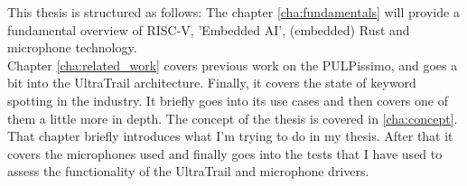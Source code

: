 This thesis is structured as follows:
The chapter \ref{cha:fundamentals} will provide a fundamental overview of RISC-V, 'Embedded AI', (embedded) Rust and microphone technology.\\
Chapter \ref{cha:related_work} covers previous work on the PULPissimo, and goes a bit into the UltraTrail architecture.
Finally, it covers the state of keyword spotting in the industry.
It briefly goes into its use cases and then covers one of them a little more in depth.
The concept of the thesis is covered in \ref{cha:concept}.
That chapter briefly introduces what I'm trying to do in my thesis.
After that it covers the microphones used and finally goes into the tests that I have used
to assess the functionality of the UltraTrail and microphone drivers.


%
%
